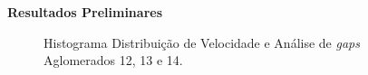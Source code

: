 \documentclass[xcolor=dvipsnames,10pt]{beamer}
\begin{document}
\begin{frame}{\textbf{Resultados Preliminares}}
\begin{figure}[!htbp]
    \caption{Histograma Distribuição de Velocidade e Análise de \textit{gaps} Aglomerados 12, 13 e 14.}
  \end{figure}
\end{frame}
\end{document}
